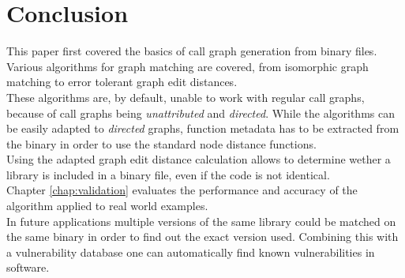 \documentclass[
    12pt,                               %
    DIV=14,                     %
    parskip=half+,              %
    bigheadings,                %
    cleardoubleempty,   %
    halfparskip,                %
    ]{scrreprt} %
\begin{document}
\chapter{Conclusion}
This paper first covered the basics of call graph generation from binary files. Various algorithms for graph matching are covered, from isomorphic graph matching to error tolerant graph edit distances. \\
These algorithms are, by default, unable to work with regular call graphs, because of call graphs being \textit{unattributed} and \textit{directed}. While the algorithms can be easily adapted to \textit{directed} graphs, function metadata has to be extracted from the binary in order to use the standard node distance functions. \\
Using the adapted graph edit distance calculation allows to determine wether a library is included in a binary file, even if the code is not identical. \\
Chapter \ref{chap:validation} evaluates the performance and accuracy of the algorithm applied to real world examples. \\ %
In future applications multiple versions of the same library could be matched on the same binary in order to find out the exact version used. Combining this with a vulnerability database one can automatically find known vulnerabilities in software.
\end{document}
